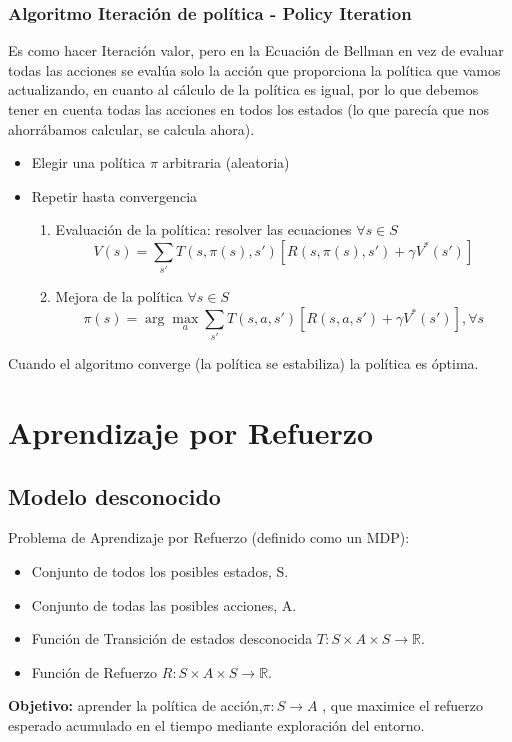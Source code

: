 \documentclass[12pt]{report} %
\begin{document}
\subsubsection{Algoritmo Iteración de política - Policy Iteration}
Es como hacer Iteración valor, pero en la Ecuación de Bellman en vez de evaluar todas las acciones se evalúa solo la acción que proporciona la política que vamos actualizando, en cuanto al cálculo de la política es igual, por lo que debemos tener en cuenta todas las acciones en todos los estados (lo que parecía que nos ahorrábamos calcular, se calcula ahora).
\begin{itemize}
  \item Elegir una política $\pi$ arbitraria (aleatoria)
  \item Repetir hasta convergencia
  \begin{enumerate}
    \item Evaluación de la política: resolver las ecuaciones $\forall s \in S$
    $$V(s) = \sum _{s'} T(s,\pi(s), s') [R(s,\pi(s),s') + \gamma V^* (s')]$$
    \item Mejora de la política $\forall s \in S$
    $$\pi(s) = \arg \max_a \sum _{s'} T(s,a, s') [R(s,a,s') + \gamma V^* (s')], \forall s$$
  \end{enumerate}
\end{itemize}
Cuando el algoritmo converge (la política se estabiliza) la política es óptima.

\section{Aprendizaje por Refuerzo}
\subsection{Modelo desconocido}
Problema de Aprendizaje por Refuerzo (definido como un MDP):
\begin{itemize}
  \item Conjunto de todos los posibles estados, S.
  \item Conjunto de todas las posibles acciones, A.
  \item Función de Transición de estados desconocida $T: S\times A \times S \rightarrow \mathbb{R}$.
  \item Función de Refuerzo $R: S \times A \times S \rightarrow \mathbb{R}$.
\end{itemize}
\textbf{Objetivo:} aprender la política de acción,$\pi: S \rightarrow A$ , que maximice el refuerzo esperado acumulado en el tiempo mediante exploración del entorno.
\end{document}
